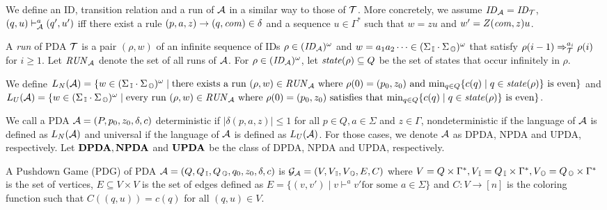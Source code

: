 
We define an ID, transition relation and
a run of ${\cal A}$ in a similar way to those of ${\cal T}$.
More concretely, we assume $\mathit{ID}_{\cal A}=\mathit{ID}_{\cal T}$,
$(q,u)\vdash^a_{\cal A}(q',u')$ iff there exist a rule $(p, a, z) \rightarrow (q, \mathit{com}) \in \delta$ and a sequence $u\in \Gamma^*$ such that $w=zu$ and $w'=Z(\mathit{com},z)u$.

A {\em run} of PDA ${\cal T}$ is a pair $(\rho, w)$ of an infinite sequence of IDs $\rho\in (\mathit{ID}_{\cal A})^\omega$ and $w = a_1 a_2 \cdots \in (\Sigma_{\, \mathbb{I}}\cdot\Sigma_{\, \mathbb{O}})^\omega$ that satisfy $\rho(i-1)\Rightarrow_{\cal T}^{a_i}\rho(i)$ for $i\geq 1$.
Let $\mathit{RUN}_{\cal A}$ denote the set of all runs of ${\cal A}$.
For $\rho \in (\mathit{ID}_{\cal A})^\omega$,
let $\mathit{state}(\rho)\subseteq Q$ be the set of states that occur infinitely in $\rho$.

We define $L_N({\cal A})=\{w\in (\Sigma_{\, \mathbb{I}} \cdot \Sigma_{\, \mathbb{O}})^\omega \mid \text{there exists a run }\allowbreak (\rho, w)\in\mathit{RUN}_{\cal A}\text{ where }\rho(0)=(p_0, z_0)\text{ and }{\rm min}_{q\in Q}\{c(q)\mid q\in\mathit{state}(\rho)\}\text{ is even}\}$ and
$L_U({\cal A})=\{w\in (\Sigma_{\, \mathbb{I}} \cdot \Sigma_{\, \mathbb{O}})^\omega \mid \text{every run }\allowbreak (\rho, w)\in\mathit{RUN}_{\cal A}\text{ where }\rho(0)=(p_0, z_0)\text{ satisfies that }{\rm min}_{q\in Q}\{c(q)\mid q\in\mathit{state}(\rho)\}\text{ is even}\}$.

We call a PDA ${\cal A}=(P, p_0, z_0, \delta, c)$ deterministic if $|\delta(p,a,z)|\leq 1$ for all $p\in Q, a\in\Sigma$ and $z\in\Gamma$,
nondeterministic if the language of ${\cal A}$ is defined as $L_N({\cal A})$ and universal if the language of ${\cal A}$ is defined as $L_U({\cal A})$.
For those cases, we denote ${\cal A}$ as DPDA, NPDA and UPDA, respectively.
Let ${\bf DPDA}, {\bf NPDA}$ and ${\bf UPDA}$ be the class of DPDA, NPDA and UPDA, respectively.

\begin{definition}
A {Pushdown Game} (PDG) of PDA ${\cal A} = (Q, Q_{\, \mathbb{I}}, Q_{\, \mathbb{O}}, q_0, z_0, \delta, c)$ is ${\cal G}_{\cal A} = (V, V_{\, \mathbb{I}}, V_{\, \mathbb{O}}, E, C)$ where
$V = Q\times\Gamma^*, V_{\, \mathbb{I}} = Q_{\, \mathbb{I}}\times\Gamma^*, V_{\, \mathbb{O}} = Q_{\, \mathbb{O}}\times\Gamma^*$ is the set of vertices, $E\subseteq V\times V$ is the set of edges defined as $E = \{(v,v') \mid v \vdash^a v' \text{for some $a\in \Sigma$}\}$
and $C: V \to [n]$ is the coloring function such that
$C((q,u)) = c(q)$ for all $(q,u)\in V$.
\end{definition}

